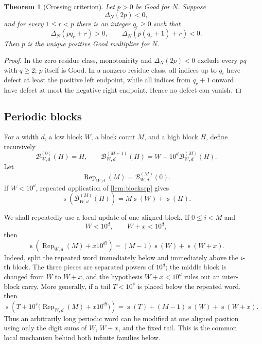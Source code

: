 \documentclass[11pt]{article}
\newtheorem{theorem}{Theorem}[section]
\newcommand{\ds}{\operatorname{s}}
\newcommand{\Def}{\Delta}
\begin{document}
\begin{theorem}[Crossing criterion]\label{thm:crosscriterion}
Let $p>0$ be Good for $N$.  Suppose
\[
 \Def_N(2p)<0,
\]
and for every $1\le r<p$ there is an integer $q_r\ge0$ such that
\[
 \Def_N(pq_r+r)>0,
 \qquad
 \Def_N(p(q_r+1)+r)<0.
\]
Then $p$ is the unique positive Good multiplier for $N$.
\end{theorem}

\begin{proof}
In the zero residue class, monotonicity and $\Def_N(2p)<0$ exclude every $pq$ with $q\ge2$; $p$ itself is Good.  In a nonzero residue class, all indices up to $q_r$ have defect at least the positive left endpoint, while all indices from $q_r+1$ onward have defect at most the negative right endpoint.  Hence no defect can vanish.
\end{proof}

\subsection{Periodic blocks}
For a width $d$, a low block $W$, a block count $M$, and a high block $H$, define recursively
\[
 \mathcal B_{W,d}^{(0)}(H)=H,
 \qquad
 \mathcal B_{W,d}^{(M+1)}(H)
   =W+10^d\mathcal B_{W,d}^{(M)}(H).
\]
Let
\[
 \operatorname{Rep}_{W,d}(M)=\mathcal B_{W,d}^{(M)}(0).
\]
If $W<10^d$, repeated application of \cref{lem:blocksep} gives
\begin{equation}\label{eq:blocksum}
 \ds\!\left(\mathcal B_{W,d}^{(M)}(H)\right)
 =M\ds(W)+\ds(H).
\end{equation}

We shall repeatedly use a local update of one aligned block.  If $0\le i<M$ and
\[
 W<10^d,\qquad W+x<10^d,
\]
then
\begin{equation}\label{eq:alignedupdate}
 \ds\!\left(\operatorname{Rep}_{W,d}(M)+x10^{di}\right)
 =(M-1)\ds(W)+\ds(W+x).
\end{equation}
Indeed, split the repeated word immediately below and immediately above the $i$-th block.  The three pieces are separated powers of $10^d$; the middle block is changed from $W$ to $W+x$, and the hypothesis $W+x<10^d$ rules out an inter-block carry.  More generally, if a tail $T<10^s$ is placed below the repeated word, then
\begin{equation}\label{eq:alignedupdatetail}
 \ds\!\left(T+10^s\bigl(\operatorname{Rep}_{W,d}(M)+x10^{di}\bigr)\right)
 =\ds(T)+(M-1)\ds(W)+\ds(W+x).
\end{equation}
Thus an arbitrarily long periodic word can be modified at one aligned position using only the digit sums of $W$, $W+x$, and the fixed tail.  This is the common local mechanism behind both infinite families below.
\end{document}
